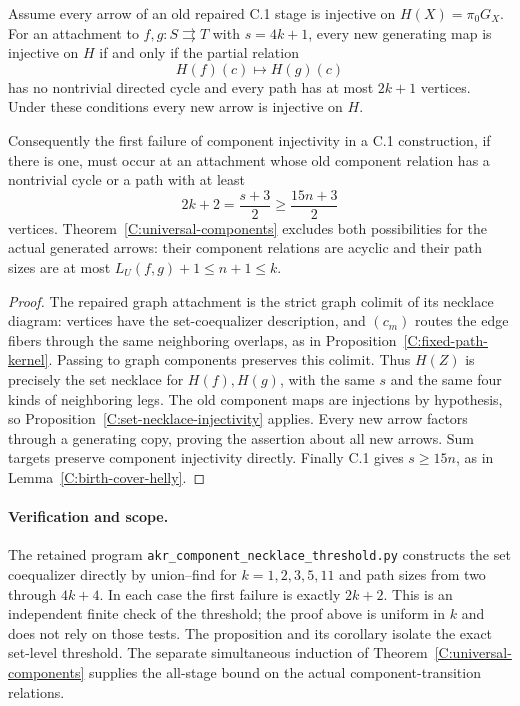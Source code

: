 \begin{corollary}
\label{C:component-necklace-obligation}
Assume every arrow of an old repaired C.1 stage is injective on
$H(X)=\pi_0G_X$. For an attachment to $f,g:S\rightrightarrows T$
with $s=4k+1$, every new generating map is injective on $H$ if
and only if the partial relation
\[
                           H(f)(c)\mapsto H(g)(c)
\]
has no nontrivial directed cycle and every path has at most
$2k+1$ vertices. Under these conditions every new arrow is
injective on $H$.

Consequently the first failure of component injectivity in a
C.1 construction, if there is one, must occur at an attachment
whose old component relation has a nontrivial cycle or a path
with at least
\[
                        2k+2=\frac{s+3}{2}
                                   \geq\frac{15n+3}{2}
\]
vertices. Theorem~\ref{C:universal-components} excludes both
possibilities for the actual generated arrows: their component
relations are acyclic and their path sizes are at most
$L_U(f,g)+1\leq n+1\leq k$.
\end{corollary}

\begin{proof}
The repaired graph attachment is the strict graph colimit of its
necklace diagram: vertices have the set-coequalizer description,
and $(c_m)$ routes the edge fibers through the same neighboring
overlaps, as in Proposition~\ref{C:fixed-path-kernel}.
Passing to graph components preserves this colimit. Thus
$H(Z)$ is precisely the set necklace for $H(f),H(g)$, with the
same $s$ and the same four kinds of neighboring legs. The old
component maps are injections by hypothesis, so
Proposition~\ref{C:set-necklace-injectivity} applies. Every
new arrow factors through a generating copy, proving the
assertion about all new arrows. Sum targets preserve component
injectivity directly. Finally C.1 gives $s\geq15n$, as in
Lemma~\ref{C:birth-cover-helly}.
\end{proof}

\paragraph{Verification and scope.}
The retained program
\texttt{akr\_component\_necklace\_threshold.py} constructs the
set coequalizer directly by union--find for $k=1,2,3,5,11$ and
path sizes from two through $4k+4$. In each case the first
failure is exactly $2k+2$. This is an independent finite check
of the threshold; the proof above is uniform in $k$ and does
not rely on those tests. The proposition and its corollary
isolate the exact set-level threshold. The separate simultaneous
induction of Theorem~\ref{C:universal-components} supplies the
all-stage bound on the actual component-transition relations.
